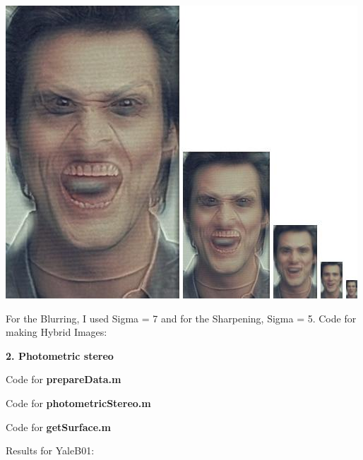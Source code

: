 \documentclass[fleqn]{article}
\begin{document}
\vspace{10 mm}
\includegraphics{jim_faces.jpg}
\vspace{10 mm}

For the Blurring, I used Sigma = 7 and for the Sharpening, Sigma = 5. 
\newpage
Code for making Hybrid Images:





\newpage

\textbf{\huge 2. Photometric stereo}

\vspace{10 mm}
Code for \textbf{prepareData.m}




Code for \textbf{photometricStereo.m}




Code for \textbf{getSurface.m}



\newpage

Results for YaleB01:
 
\end{document}
